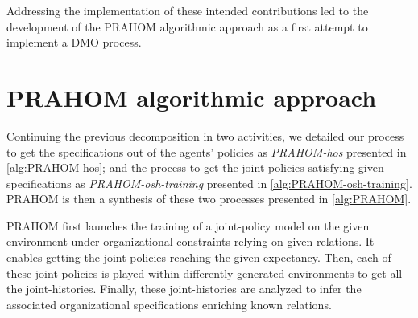\documentclass{ecai}
\newcounter{relation}
\begin{document}
Addressing the implementation of these intended contributions led to the development of the PRAHOM algorithmic approach as a first attempt to implement a DMO process.

\section{PRAHOM algorithmic approach}

Continuing the previous decomposition in two activities, we detailed our process to get the specifications out of the agents' policies as \emph{PRAHOM-hos} presented in \autoref{alg:PRAHOM-hos}; and the process to get the joint-policies satisfying given specifications as \emph{PRAHOM-osh-training} presented in \autoref{alg:PRAHOM-osh-training}. PRAHOM is then a synthesis of these two processes presented in \autoref{alg:PRAHOM}.

PRAHOM first launches the training of a joint-policy model on the given environment under organizational constraints relying on given relations. It enables getting the joint-policies reaching the given expectancy. Then, each of these joint-policies is played within differently generated environments to get all the joint-histories. Finally, these joint-histories are analyzed to infer the associated organizational specifications enriching known relations.

\end{document}
